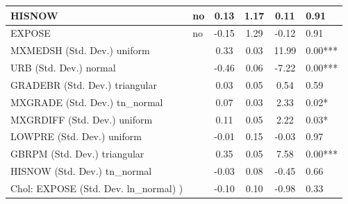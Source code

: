 \begin{table}
\begin{center}
\begin{tabular}{|l|l|c|c|c|l|}
			\hline
			HISNOW & no & 0.13 & 1.17 & 0.11 & 0.91 \\
			\hline
			EXPOSE & no & -0.15 & 1.29 & -0.12 & 0.91 \\
			\hline
			MXMEDSH (Std. Dev.) uniform &  & 0.33 & 0.03 & 11.99 & 0.00*** \\
			\hline
			URB (Std. Dev.) normal &  & -0.46 & 0.06 & -7.22 & 0.00*** \\
			\hline
			GRADEBR (Std. Dev.) triangular &  & 0.03 & 0.05 & 0.54 & 0.59 \\
			\hline
			MXGRADE (Std. Dev.) tn_normal &  & 0.07 & 0.03 & 2.33 & 0.02* \\
			\hline
			MXGRDIFF (Std. Dev.) uniform &  & 0.11 & 0.05 & 2.22 & 0.03* \\
			\hline
			LOWPRE (Std. Dev.) uniform &  & -0.01 & 0.15 & -0.03 & 0.97 \\
			\hline
			GBRPM (Std. Dev.) triangular &  & 0.35 & 0.05 & 7.58 & 0.00*** \\
			\hline
			HISNOW (Std. Dev.) tn_normal &  & -0.03 & 0.08 & -0.45 & 0.66 \\
			\hline
			 Chol: EXPOSE (Std. Dev. ln_normal) ) &  & -0.10 & 0.10 & -0.98 & 0.33 \\
			\hline
		\end{tabular}
	\end{center}
\end{table}